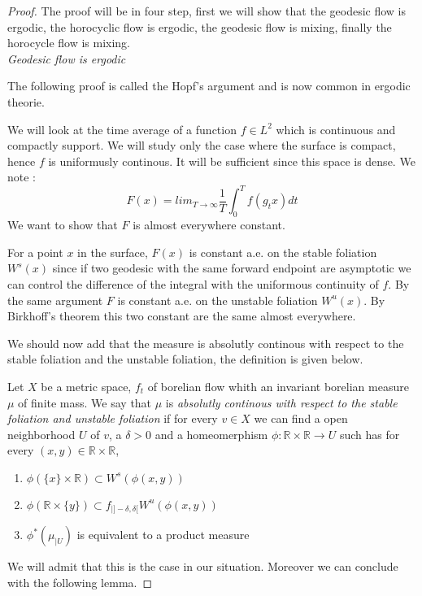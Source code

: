 \begin{proof}
The proof will be in four step, first we will show that the geodesic flow is ergodic, the horocyclic flow is ergodic, the geodesic flow is mixing, finally the horocycle flow is mixing.\\


\emph{Geodesic flow is ergodic}

The following proof is called the Hopf's argument \cite{Hopf1939} and is now common in ergodic theorie.

We will look at the time average of a function $f \in L^2$ which is continuous and compactly support. We will study only the case where the surface is compact, hence $f$ is uniformusly continous. It will be sufficient since this space is dense. We note : \[
F(x) = lim_{T \to \infty} \frac{1}{T} \int_0^T f(g_t x)dt
\]
We want to show that $F$ is almost everywhere constant.


For a point $x$ in the surface, $F(x)$ is constant a.e. on the stable foliation $W^s(x)$ since if two geodesic with the same forward endpoint are asymptotic we can control the difference of the integral with the uniformous continuity of $f$. By the same argument $F$ is constant a.e. on the unstable foliation $W^u(x)$. By Birkhoff's theorem this two constant are the same almost everywhere.

We should now add that the measure is absolutly continous with respect to the stable foliation and the unstable foliation, the definition is given below.
\begin{dfnt}
Let $X$ be a metric space, $ f_t $ of borelian flow whith an invariant borelian measure $\mu$ of finite mass.
 We say that $\mu$ is \emph{absolutly continous with respect to the stable foliation and unstable foliation} if for every $v \in X $ we can find a open neighborhood $U$ of $v$, a $\delta>0$ and a homeomerphism  $\phi:\mathbb{R} \times \mathbb{R} \to U $ such has for every $(x,y) \in \mathbb{R} \times \mathbb{R} $,
\begin{enumerate}
\item $\phi(\{x\}\times \mathbb{R}) \subset W^s(\phi(x,y))$
\item $\phi( \mathbb{R} \times \{y\}) \subset f_{|]-\delta,\delta[} W^u(\phi(x,y))$
\item $\phi^* (\mu_{|U})$ is equivalent to a product measure
\end{enumerate}
\end{dfnt}

We will admit that this is the case in our situation. Moreover we can conclude with the following lemma.


\end{proof}

